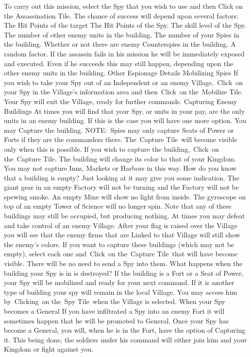 To carry out this mission, select the Spy that you wish to use and then Click on the Assassination Tile.
The chance of success will depend upon several factors:
The Hit Points of the target
The Hit Points of the Spy.
The skill level of the Spy.
The number of other enemy units in the building.
The number of your Spies in the building.
Whether or not there are enemy Counterspies in the building.
A random factor.
If the assassin fails in his mission he will be immediately exposed and executed. Even if he succeeds this may still happen, depending upon the other enemy units in the building.
Other Espionage Details
Mobilizing Spies
If you wish to take your Spy out of an Independent or an enemy Village, Click on your Spy in the Village’s information area and then Click on the Mobilize Tile. Your Spy will exit the Village, ready for further commands.
Capturing Enemy Buildings
At times you will find that your Spy, or units in your pay, are the only units in an enemy building. If this is the case you will have one more option. You may Capture the building.
NOTE: Spies may only capture Seats of Power or Forts if they are the commanders there.
The Capture Tile will become visible only when this is possible. If you wish to capture the building, Click on the Capture Tile. The building will change its color to that of your Kingdom.
You may not capture Inns, Markets or Harbors in this way.
How do you know that a building is empty?
Just looking at it may give you some indication. The giant gear in an empty Factory will not be turning and the Factory will not be spewing smoke. An empty Mine will show no light from inside. The gyroscope on top of an empty Tower of Science will no longer spin. Note that any of these buildings may still be occupied, but producing nothing.
At times you may defeat and take control of an enemy Village. After your flag is raised over the Village you will see that the enemy firms that are Linked to that Village will still show the enemy’s colors. If you want to capture these buildings (which may not be empty), select each one and Click on the Capture Tile that will have become visible. There will be no need to send a Spy into them.
What happens when the building your Spy is in is
destroyed?
If the building is a Fort or a Seat of Power, your Spy will be mobilized and ready for your next command.
If it is another type of building your spy will remain in the local Village. You may access him by Clicking on the Spy Tile when the Village is selected.
When your Spy becomes a General
If you have infiltrated a Spy into an enemy Fort it will sometimes happen that he will be promoted to General. Once your Spy has become a General, you will, when he is in the Fort, have the option of Capturing it. This being done, the soldiers under his command will either join him and your Kingdom or fight against you.

